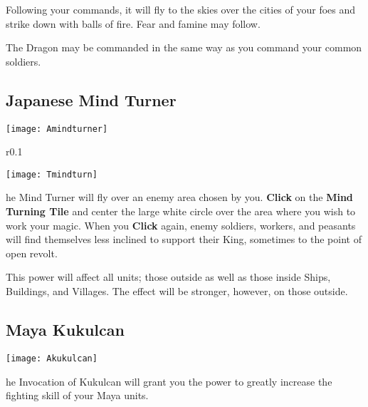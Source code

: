 
Following your commands, it will fly to the skies over the cities of your foes and strike down with balls of fire. Fear and famine may follow.

The Dragon may be commanded in the same way as you command your common soldiers.

\subsection{Japanese Mind Turner}


\begin{center}
    \texttt{[image: Amindturner]}
\end{center}

\begin{wrapfigure}{r}{0.1\textwidth}
    \vspace{-20pt}
    \begin{center}
        \texttt{[image: Tmindturn]}
    \end{center}
    \vspace{-20pt}
\end{wrapfigure}

he Mind Turner will fly over an enemy area chosen by you. \textbf{Click} on the \textbf{Mind Turning Tile} and center the large white circle over the area where you wish to work your magic. When you \textbf{Click} again, enemy soldiers, workers, and peasants will find themselves less inclined to support their King, sometimes to the point of open revolt.

This power will affect all units; those outside as well as those inside Ships, Buildings, and Villages. The effect will be stronger, however, on those outside.

\subsection{Maya Kukulcan}


\begin{center}
    \texttt{[image: Akukulcan]}
\end{center}

he Invocation of Kukulcan will grant you the power to greatly increase the fighting skill of your Maya units.

